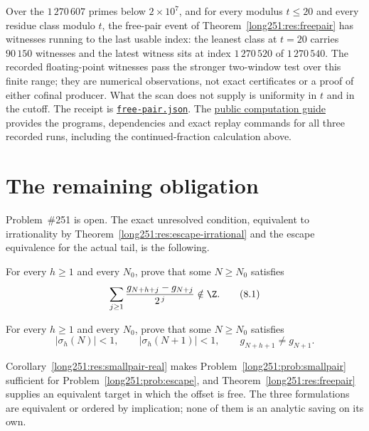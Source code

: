 \documentclass[11pt]{article}
\begin{document}
Over the $1\,270\,607$ primes below $2\times10^{7}$, and for every modulus
$t\le20$ and every residue class modulo $t$, the free-pair event of
Theorem~\ref{long251:res:freepair} has witnesses running to the last usable index: the
leanest class at $t=20$ carries $90\,150$ witnesses and the latest witness sits
at index $1\,270\,520$ of $1\,270\,540$.  The recorded floating-point witnesses
pass the stronger two-window test over this finite range; they are numerical
observations, not exact certificates or a proof of either cofinal producer.  What the
scan does not supply is uniformity in $t$ and in the cutoff.  The receipt is
\href{https://github.com/wcook04/plectis-erdos/blob/dd6cc708f650f061de06594eba6ba43878f4de31/research/experiments/erdos251/receipts/free-pair.json}{\texttt{free-pair.json}}.
The \href{https://github.com/wcook04/plectis-erdos/blob/dd6cc708f650f061de06594eba6ba43878f4de31/research/experiments/erdos251/README.md}{public computation guide}
provides the programs, dependencies and exact replay commands for all three
recorded runs, including the continued-fraction calculation above.

\section{The remaining obligation}\label{long251:sec:open}

Problem~\#251 is open.  The exact unresolved condition, equivalent to
irrationality by Theorem~\ref{long251:res:escape-irrational} and the escape
equivalence for the actual tail, is the following.

\begin{problem}\label{long251:prob:escape}
For every $h\ge1$ and every $N_0$, prove that some $N\ge N_0$ satisfies
\[
 \sum_{j\ge1}\frac{g_{N+h+j}-g_{N+j}}{2^{\,j}}\notin\Z .
\tag{8.1}\label{long251:eq:shift-escape}
\]
\end{problem}

\begin{problem}\label{long251:prob:smallpair}
For every $h\ge1$ and every $N_0$, prove that some $N\ge N_0$ satisfies
\[
 \bigl|\sigma_h(N)\bigr|<1,\qquad
 \bigl|\sigma_h(N+1)\bigr|<1,\qquad
 g_{N+h+1}\ne g_{N+1} .
\tag{8.2}\label{long251:eq:smallpair}
\]
\end{problem}

Corollary~\ref{long251:res:smallpair-real} makes Problem~\ref{long251:prob:smallpair}
sufficient for Problem~\ref{long251:prob:escape}, and Theorem~\ref{long251:res:freepair}
supplies an equivalent target in which the offset is free.  The three
formulations are equivalent or ordered by implication;
none of them is an analytic saving on its own.
\end{document}
